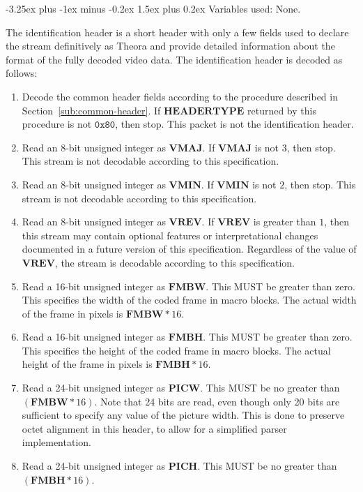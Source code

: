 \documentclass[9pt,letterpaper]{book}
\makeatletter
\newcommand{\bitvar}[1]{\ensuremath{\mathbf{\bm{#1}}}}
\newcommand{\hex}[1]{\ensuremath{\mathtt{0x#1}}}
\numberwithin{equation}{chapter}
\numberwithin{figure}{chapter}
\numberwithin{table}{chapter}
\renewcommand{\paragraph}{\@startsection{paragraph}{4}{0ex}%
 {-3.25ex plus -1ex minus -0.2ex}%
 {1.5ex plus 0.2ex}%
 {\normalfont\normalsize\bfseries}}
\makeatother
\begin{document}
\paragraph{Variables used:} None.
\medskip

The identification header is a short header with only a few fields used to
 declare the stream definitively as Theora and provide detailed information
 about the format of the fully decoded video data.
The identification header is decoded as follows:

\begin{enumerate}
\item
Decode the common header fields according to the procedure described in
 Section~\ref{sub:common-header}.
If \bitvar{HEADERTYPE} returned by this procedure is not \hex{80}, then stop.
This packet is not the identification header.
\item
Read an 8-bit unsigned integer as \bitvar{VMAJ}.
If \bitvar{VMAJ} is not $3$, then stop.
This stream is not decodable according to this specification.
\item
Read an 8-bit unsigned integer as \bitvar{VMIN}.
If \bitvar{VMIN} is not $2$, then stop.
This stream is not decodable according to this specification.
\item
Read an 8-bit unsigned integer as \bitvar{VREV}.
If \bitvar{VREV} is greater than $1$, then this stream
may contain optional features or interpretational changes 
documented in a future version of this specification.
Regardless of the value of \bitvar{VREV}, the stream is decodable 
according to this specification.
\item
Read a 16-bit unsigned integer as \bitvar{FMBW}.
This MUST be greater than zero.
This specifies the width of the coded frame in macro blocks.
The actual width of the frame in pixels is $\bitvar{FMBW}*16$.
\item
Read a 16-bit unsigned integer as \bitvar{FMBH}.
This MUST be greater than zero.
This specifies the height of the coded frame in macro blocks.
The actual height of the frame in pixels is $\bitvar{FMBH}*16$.
\item
Read a 24-bit unsigned integer as \bitvar{PICW}.
This MUST be no greater than $(\bitvar{FMBW}*16)$.
Note that 24 bits are read, even though only 20 bits are sufficient to specify
 any value of the picture width.
This is done to preserve octet alignment in this header, to allow for a
 simplified parser implementation.
\item
Read a 24-bit unsigned integer as \bitvar{PICH}.
This MUST be no greater than $(\bitvar{FMBH}*16)$.

\end{enumerate}
\end{document}
